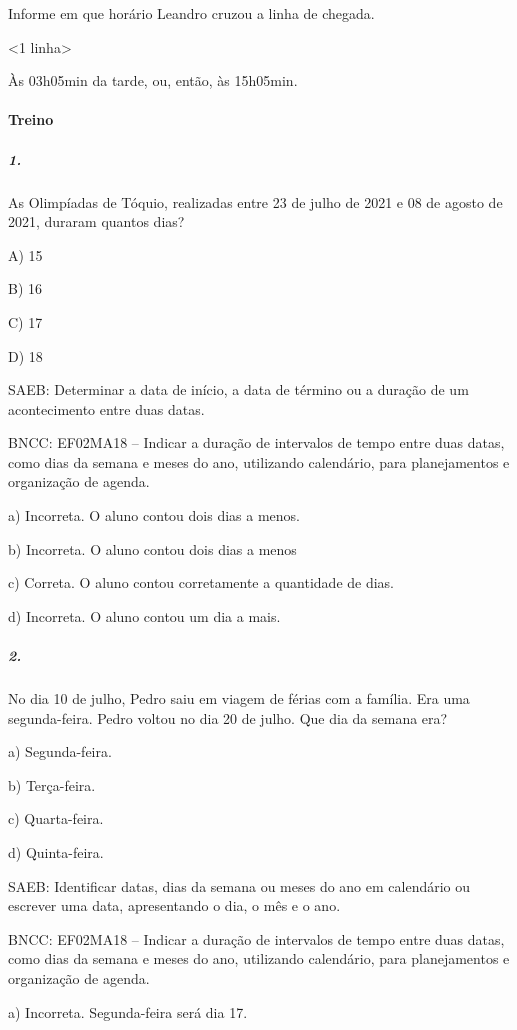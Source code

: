 Informe em que horário Leandro cruzou a linha de chegada.

\textless{}1 linha\textgreater{}

Às 03h05min da tarde, ou, então, às 15h05min.

\paragraph{Treino}\label{treino-3}

\subparagraph{1.}\label{section-54}

As Olimpíadas de Tóquio, realizadas entre 23 de julho de 2021 e 08 de
agosto de 2021, duraram quantos dias?

A) 15

B) 16

C) 17

D) 18

SAEB: Determinar a data de início, a data de término ou a
duração de um acontecimento entre duas datas.

BNCC: EF02MA18 -- Indicar a duração de intervalos de tempo entre duas
datas, como dias da semana e meses do ano, utilizando calendário, para planejamentos e organização
de agenda.

a) Incorreta. O aluno contou dois dias a menos.

b) Incorreta. O aluno contou dois dias a menos

c) Correta. O aluno contou corretamente a quantidade de dias.

d) Incorreta. O aluno contou um dia a mais.

\subparagraph{2.}\label{section-55}

No dia 10 de julho, Pedro saiu em viagem de férias com a família. Era
uma segunda-feira. Pedro voltou no dia 20 de julho. Que dia da semana
era?

a) Segunda-feira.

b) Terça-feira.

c) Quarta-feira.

d) Quinta-feira.

SAEB: Identificar datas, dias da semana ou meses do ano em calendário ou escrever uma data, apresentando o dia, o mês e o ano.

BNCC: EF02MA18 -- Indicar a duração de intervalos de tempo entre duas datas, como dias da semana e meses do ano, utilizando calendário, para planejamentos e organização de agenda.

a) Incorreta. Segunda-feira será dia 17.

